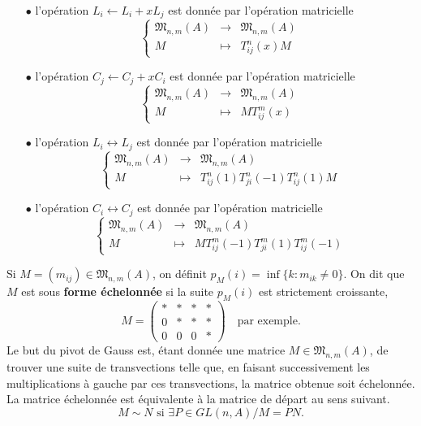 \begin{itemize}
\item[$\bullet$] l'opération $L_i\leftarrow L_i+xL_j$ est donnée par l'opération matricielle
\[\left\{\begin{array}{lll} \mathfrak M_{n,m}(A) & \rightarrow & \mathfrak M_{n,m}(A) \\ M & \mapsto& T_{ij}^n(x) M\end{array}\right.\]
\item[$\bullet$] l'opération $C_j\leftarrow C_j+xC_i$ est donnée par l'opération matricielle
\[\left\{\begin{array}{lll} \mathfrak M_{n,m}(A) & \rightarrow & \mathfrak M_{n,m}(A) \\ M & \mapsto & M T_{ij}^m(x)\end{array}\right.\]
\item[$\bullet$] l'opération $L_i\leftrightarrow L_j $ est donnée par l'opération matricielle
\[\left\{\begin{array}{lll} \mathfrak M_{n,m}(A) & \rightarrow & \mathfrak M_{n,m}(A) \\ M & \mapsto& T_{ij}^n(1)T_{ji}^n(-1)T_{ij}^n(1) M\end{array}\right.\]
\item[$\bullet$] l'opération $C_i\leftrightarrow C_j $ est donnée par l'opération matricielle
\[\left\{\begin{array}{lll} \mathfrak M_{n,m}(A) & \rightarrow & \mathfrak M_{n,m}(A) \\ M & \mapsto& MT_{ij}^m(-1)T_{ji}^m(1)T_{ij}^m(-1) \end{array}\right.\]
\end{itemize}

Si $M=(m_{ij})\in \mathfrak M_{n,m}(A)$, on définit $p_M(i)=\inf\{k : m_{ik}\neq 0\}$. On dit que $M$ est sous \textbf{forme échelonnée} si la suite $p_M(i)$ est strictement croissante, 
\[M=\begin{pmatrix}
* & * & *& *\\
0 & * &*& *\\
0& 0 & 0 & *
\end{pmatrix}\quad \text{par exemple.}\]
Le but du pivot de Gauss est, étant donnée une matrice $M\in \mathfrak M_{n,m}(A)$, de trouver une suite de transvections telle que, en faisant successivement les multiplications à gauche par ces transvections, la matrice obtenue soit échelonnée. La matrice échelonnée est équivalente à la matrice de départ au sens suivant.
\[M\sim N \text{ si }\exists P\in GL(n,A)/ M=PN. \]

